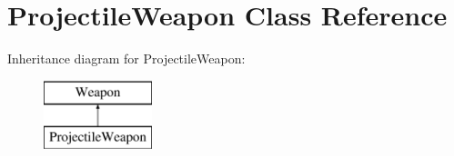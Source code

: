 \hypertarget{class_projectile_weapon}{}\section{Projectile\+Weapon Class Reference}
\label{class_projectile_weapon}
Inheritance diagram for Projectile\+Weapon\+:\begin{figure}[H]
\begin{center}
\leavevmode
\includegraphics[height=2.000000cm]{class_projectile_weapon}
\end{center}
\end{figure}
